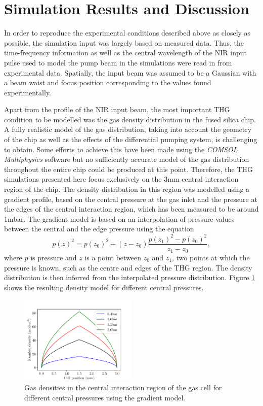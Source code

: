 \documentclass[a4paper]{jpconf}
\begin{document}
\section{Simulation Results and Discussion}
In order to reproduce the experimental conditions described above as closely as possible, the simulation input was largely based on measured data. Thus, the time-frequency information as well as the central wavelength of the NIR input pulse used to model the pump beam in the simulations were read in from experimental data. Spatially, the input beam was assumed to be a Gaussian with a beam waist and focus position corresponding to the values found experimentally. \par 
Apart from the profile of the NIR input beam, the most important THG condition to be modelled was the gas density distribution in the fused silica chip. A fully realistic model of the gas distribution, taking into account the geometry of the chip as well as the effects of the differential pumping system, is challenging to obtain. Some efforts to achieve this have been made using the \textit{COMSOL Multiphysics} software but no sufficiently accurate model of the gas distribution throughout the entire chip could be produced at this point. Therefore, the THG simulations presented here focus exclusively on the 3mm central interaction region of the chip. The density distribution in this region was modelled using a gradient profile, based on the central pressure at the gas inlet and the pressure at the edges of the central interaction region, which has been measured to be around 1mbar. The gradient model is based on an interpolation of pressure values between the central and the edge pressure using the equation 
\begin{equation}
p(z)^2 = p(z_0)^2 + (z-z_0) \frac{p(z_1)^2 - p(z_0)^2}{z_1 - z_0}, 
\end{equation}
where $p$ is pressure and $z$ is a point between $z_0$ and $z_1$, two points at which the pressure is known, such as the centre and edges of the THG region. The density distribution is then inferred from the interpolated pressure distribution. Figure \ref{im:grad} shows the resulting density model for different central pressures. \par 
\begin{figure}[h]
\centering
\includegraphics[width=0.5\textwidth]{im/grad_model}
\caption{Gas densities in the central interaction region of the gas cell for different central pressures using the gradient model.}\label{im:grad}
\end{figure} 
\end{document}
